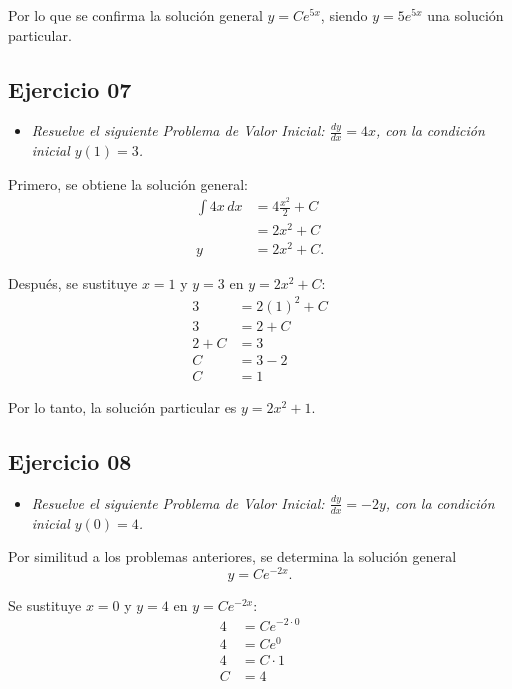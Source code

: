 \documentclass[12pt]{article}
\begin{document}
Por lo que se confirma la solución general \(y = Ce^{5x}\), siendo \(y = 5e^{5x}\) una solución particular.

\subsection*{\centering Ejercicio 07 }

\begin{itemize}
    \item \emph{Resuelve el siguiente Problema de Valor Inicial: \(\frac{dy}{dx} = 4x\), con la condición inicial \(y(1) = 3\).}
\end{itemize}

Primero, se obtiene la solución general:
\begin{align*}
    \int 4x \, dx &= 4\frac{x^{2}}{2} + C \\
    &= 2x^{2} + C \\
    y &= 2x^{2} + C.
\end{align*}

Después, se sustituye \(x = 1\) y \(y = 3\) en \(y = 2x^{2} + C\):
\begin{align*}
    3 &= 2(1)^{2} + C \\
    3 &= 2 + C \\
    2 + C &= 3 \\
    C &= 3 - 2 \\
    C &= 1
\end{align*}

Por lo tanto, la solución particular es \(y = 2x^{2} + 1\).

\subsection*{\centering Ejercicio 08 }

\begin{itemize}
    \item \emph{Resuelve el siguiente Problema de Valor Inicial: \(\frac{dy}{dx} = -2y\), con la condición inicial \(y(0) = 4\).}
\end{itemize}

Por similitud a los problemas anteriores, se determina la solución general
\[ y = Ce^{-2x}. \]

Se sustituye \(x = 0\) y \(y = 4\) en \(y = Ce^{-2x}\):
\begin{align*}
    4 &= Ce^{-2 \cdot 0} \\
    4 &= Ce^{0} \\
    4 &= C \cdot 1 \\
    C &= 4
\end{align*}
\end{document}

